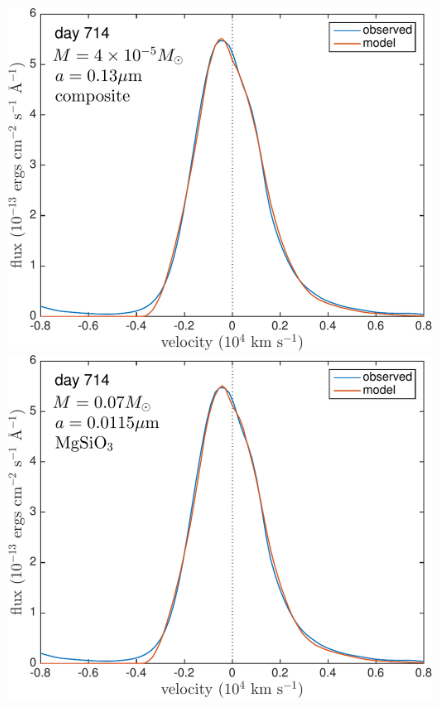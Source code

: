 \begin{landscape}
\begin{figure}
\includegraphics[trim =0 0 0 -10,clip=true,scale=0.33]{chapters/chapter5/images/silicates_take2/composite_bestfit_Ha.pdf}
\includegraphics[trim =24 0 0 -10,clip=true,scale=0.33]{chapters/chapter5/images/silicates_take2/MgSiO3_bestfit_Ha.pdf}

\end{figure}
\end{landscape}
